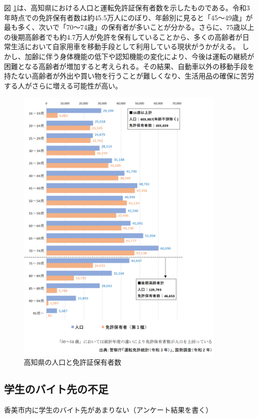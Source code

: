 図 \ref{fig:免許}は、高知県における人口と運転免許証保有者数を示したものである。令和3年時点での免許保有者数は約45.5万人にのぼり、年齢別に見ると「45～49歳」が最も多く、次いで「70～74歳」の保有者が多いことが分かる。さらに、75歳以上の後期高齢者でも約4.7万人が免許を保有していることから、多くの高齢者が日常生活において自家用車を移動手段として利用している現状がうかがえる。
しかし、加齢に伴う身体機能の低下や認知機能の変化により、今後は運転の継続が困難となる高齢者が増加すると考えられる。その結果、自動車以外の移動手段を持たない高齢者が外出や買い物を行うことが難しくなり、生活用品の確保に苦労する人がさらに増える可能性が高い。


\begin{figure}[H]
  \centering
  \includegraphics[width=0.9\textwidth]{免許証.png}
  \caption{高知県の人口と免許証保有者数}
  \label{fig:免許}
\end{figure}


\subsection{学生のバイト先の不足}
香美市内に学生のバイト先があまりない（アンケート結果を書く）
